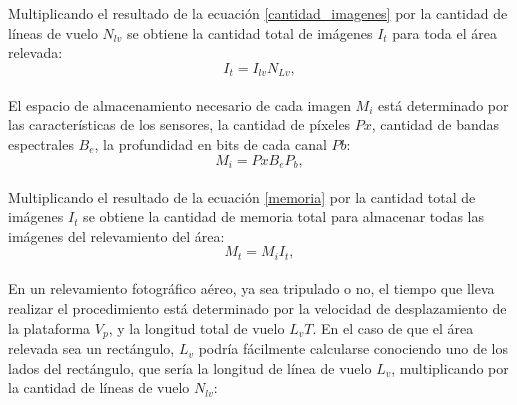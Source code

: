 Multiplicando el resultado de la ecuación \ref{cantidad_imagenes} por la cantidad de líneas de vuelo $N_{lv}$ se obtiene la cantidad total de imágenes $I_t$ para toda el área relevada:
\\
\begin{equation}
	I_t={I_{lv}}{N_{Lv}},\label{cantidad_total_imagenes}
\end{equation}
\\
El espacio de almacenamiento necesario de cada imagen $M_i$ está determinado por las características de los sensores, la cantidad de píxeles $Px$, cantidad de bandas espectrales $B_e$, la profundidad en bits de cada canal $Pb$:
\\
\begin{equation}
	M_i={Px}{B_e}{P_b},\label{memoria}
\end{equation}
\\
Multiplicando el resultado de la ecuación \ref{memoria} por la cantidad total de imágenes $I_t$ se obtiene la cantidad de memoria total para almacenar todas las imágenes del relevamiento del área:
\\
\begin{equation}
	M_t={M_i}{I_t},\label{memoria_total}
\end{equation}
\\
En un relevamiento fotográfico aéreo, ya sea tripulado o no, el tiempo que lleva realizar el procedimiento está determinado por la velocidad de desplazamiento de la plataforma $V_p$, y la longitud total de vuelo $L_vT$. 
En el caso de que el área relevada sea un rectángulo, $L_v$ podría fácilmente calcularse conociendo uno de los lados del rectángulo, que sería la longitud de línea de vuelo $L_v$, multiplicando por la cantidad de líneas de vuelo $N_{lv}$:
